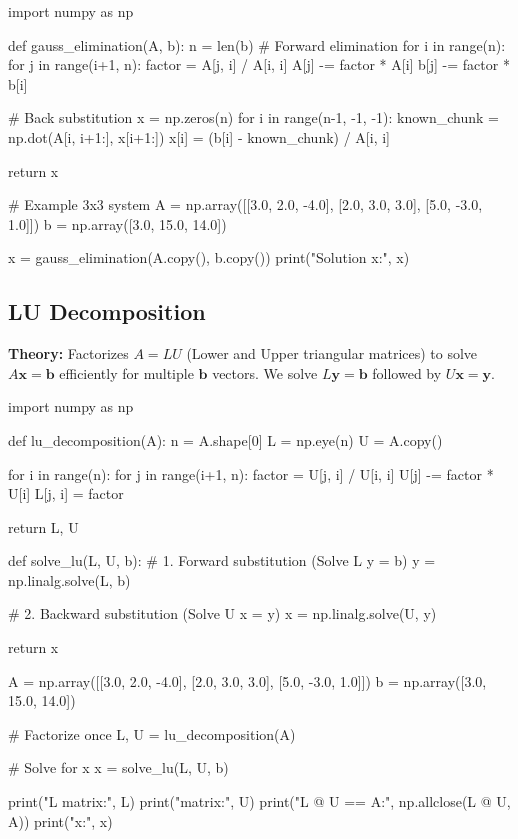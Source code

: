 \documentclass{article}
\begin{document}
\begin{jupytercode}
import numpy as np

def gauss_elimination(A, b):
    n = len(b)
    # Forward elimination
    for i in range(n):
        for j in range(i+1, n):
            factor = A[j, i] / A[i, i]
            A[j] -= factor * A[i]
            b[j] -= factor * b[i]
            
    # Back substitution
    x = np.zeros(n)
    for i in range(n-1, -1, -1):
        known_chunk = np.dot(A[i, i+1:], x[i+1:])
        x[i] = (b[i] - known_chunk) / A[i, i]
        
    return x

# Example 3x3 system
A = np.array([[3.0, 2.0, -4.0], [2.0, 3.0, 3.0], [5.0, -3.0, 1.0]])
b = np.array([3.0, 15.0, 14.0])

x = gauss_elimination(A.copy(), b.copy())
print("Solution x:", x)
\end{jupytercode}
\newpage

\subsection{LU Decomposition}
\textbf{Theory:} Factorizes $A = LU$ (Lower and Upper triangular matrices) to solve $A\mathbf{x} = \mathbf{b}$ efficiently for multiple $\mathbf{b}$ vectors. We solve $L\mathbf{y} = \mathbf{b}$ followed by $U\mathbf{x} = \mathbf{y}$.

\begin{jupytercode}
import numpy as np

def lu_decomposition(A):
    n = A.shape[0]
    L = np.eye(n)
    U = A.copy()
    
    for i in range(n):
        for j in range(i+1, n):
            factor = U[j, i] / U[i, i]
            U[j] -= factor * U[i]
            L[j, i] = factor
            
    return L, U

def solve_lu(L, U, b):
    # 1. Forward substitution (Solve L y = b)
    y = np.linalg.solve(L, b)
        
    # 2. Backward substitution (Solve U x = y)
    x = np.linalg.solve(U, y)
        
    return x

A = np.array([[3.0, 2.0, -4.0], [2.0, 3.0, 3.0], [5.0, -3.0, 1.0]])
b = np.array([3.0, 15.0, 14.0])

# Factorize once
L, U = lu_decomposition(A)

# Solve for x
x = solve_lu(L, U, b)

print("L matrix:\n", L)
print("\nU matrix:\n", U)
print("\nVerify L @ U == A:\n", np.allclose(L @ U, A))
print("\nSolution x:", x)
\end{jupytercode}
\newpage
\end{document}
